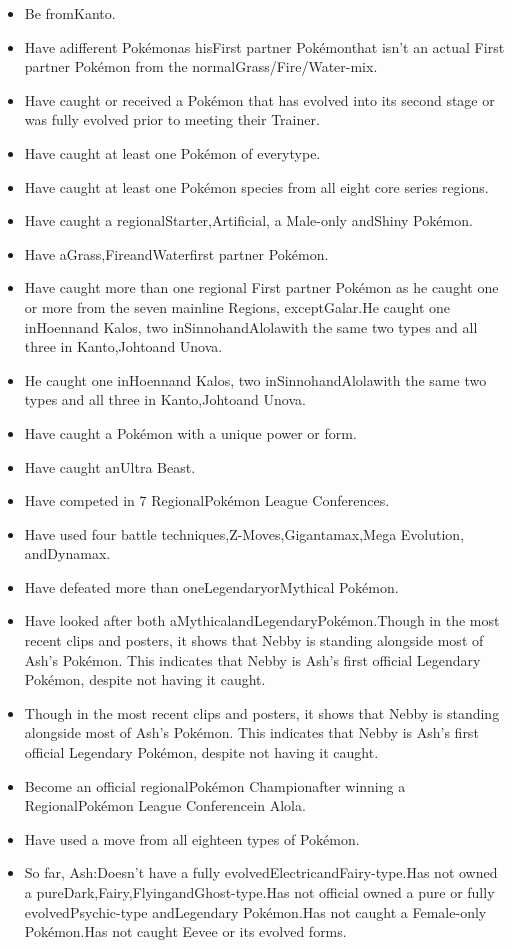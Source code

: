 \documentclass[a4paper,12pt]{article}
\begin{document}
\begin{itemize}
\item Be fromKanto.
\item Have adifferent Pokémonas hisFirst partner Pokémonthat isn't an actual First partner Pokémon from the normalGrass/Fire/Water-mix.
\item Have caught or received a Pokémon that has evolved into its second stage or was fully evolved prior to meeting their Trainer.
\item Have caught at least one Pokémon of everytype.
\item Have caught at least one Pokémon species from all eight core series regions.
\item Have caught a regionalStarter,Artificial, a Male-only andShiny Pokémon.
\item Have aGrass,FireandWaterfirst partner Pokémon.
\item Have caught more than one regional First partner Pokémon as he caught one or more from the seven mainline Regions, exceptGalar.He caught one inHoennand Kalos, two inSinnohandAlolawith the same two types and all three in Kanto,Johtoand Unova.
\item He caught one inHoennand Kalos, two inSinnohandAlolawith the same two types and all three in Kanto,Johtoand Unova.
\item Have caught a Pokémon with a unique power or form.
\item Have caught anUltra Beast.
\item Have competed in 7 RegionalPokémon League Conferences.
\item Have used four battle techniques,Z-Moves,Gigantamax,Mega Evolution, andDynamax.
\item Have defeated more than oneLegendaryorMythical Pokémon.
\item Have looked after both aMythicalandLegendaryPokémon.Though in the most recent clips and posters, it shows that Nebby is standing alongside most of Ash's Pokémon. This indicates that Nebby is Ash's first official Legendary Pokémon, despite not having it caught.
\item Though in the most recent clips and posters, it shows that Nebby is standing alongside most of Ash's Pokémon. This indicates that Nebby is Ash's first official Legendary Pokémon, despite not having it caught.
\item Become an official regionalPokémon Championafter winning a RegionalPokémon League Conferencein Alola.
\item Have used a move from all eighteen types of Pokémon.
\item So far, Ash:Doesn't have a fully evolvedElectricandFairy-type.Has not owned a pureDark,Fairy,FlyingandGhost-type.Has not official owned a pure or fully evolvedPsychic-type andLegendary Pokémon.Has not caught a Female-only Pokémon.Has not caught Eevee or its evolved forms.

\end{itemize}
\end{document}
